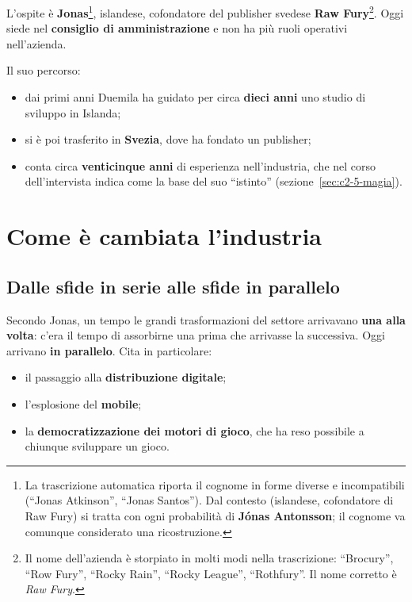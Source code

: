 L'ospite è \textbf{Jonas}\footnote{La trascrizione automatica riporta il cognome
in forme diverse e incompatibili (``Jonas Atkinson'', ``Jonas Santos''). Dal
contesto (islandese, cofondatore di Raw Fury) si tratta con ogni probabilità di
\textbf{Jónas Antonsson}; il cognome va comunque considerato una ricostruzione.},
islandese, cofondatore del publisher svedese \textbf{Raw
Fury}\footnote{Il nome dell'azienda è storpiato in molti modi nella trascrizione:
``Brocury'', ``Row Fury'', ``Rocky Rain'', ``Rocky League'', ``Rothfury''. Il nome
corretto è \emph{Raw Fury}.}. Oggi siede nel \textbf{consiglio di
amministrazione} e non ha più ruoli operativi nell'azienda.

Il suo percorso:
\begin{itemize}
  \item dai primi anni Duemila ha guidato per circa \textbf{dieci anni} uno studio
        di sviluppo in Islanda;
  \item si è poi trasferito in \textbf{Svezia}, dove ha fondato un publisher;
  \item conta circa \textbf{venticinque anni} di esperienza nell'industria, che
        nel corso dell'intervista indica come la base del suo ``istinto''
        (sezione~\ref{sec:c2-5-magia}).
\end{itemize}

\section{Come è cambiata l'industria}
\label{sec:c2-5-industria}

\subsection{Dalle sfide in serie alle sfide in parallelo}

Secondo Jonas, un tempo le grandi trasformazioni del settore arrivavano
\textbf{una alla volta}: c'era il tempo di assorbirne una prima che arrivasse la
successiva. Oggi arrivano \textbf{in parallelo}. Cita in particolare:
\begin{itemize}
  \item il passaggio alla \textbf{distribuzione digitale};
  \item l'esplosione del \textbf{mobile};
  \item la \textbf{democratizzazione dei motori di gioco}, che ha reso possibile a
        chiunque sviluppare un gioco.
\end{itemize}

